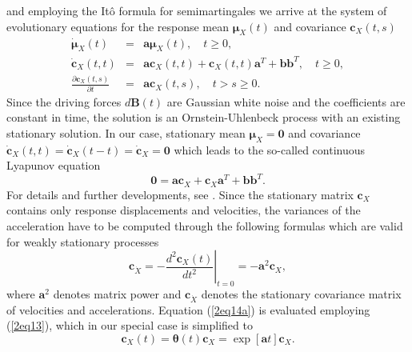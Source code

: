\documentclass[preprint,12pt,authoryear]{elsarticle}
\newcommand{\bs}[1]{{\boldsymbol{#1}}}
\begin{document}
and employing the It\^{o} formula for semimartingales we arrive at the system of evolutionary equations for the response mean $\bs{\mu}_X(t)$ and covariance $\bs{c}_X(t,s)$
\begin{eqnarray}
\bs{\dot{\mu}}_X(t)&=&\bs{a\mu}_X(t),\quad t\geq0,\label{2eq11}\\
\bs{\dot{c}}_X(t,t)&=&\bs{ac}_X(t,t)+\bs{c}_X(t,t)\bs{a}^T+\bs{bb}^T,\quad t\geq0,\label{2eq12}\\
\frac{\partial\bs{c}_X(t,s)}{\partial t}&=&\bs{ac}_X(t,s),\quad t>s\geq0.\label{2eq13}
\end{eqnarray}
Since the driving forces $d\bs{B}(t)$ are Gaussian white noise and the coefficients are constant in time, the solution is an Ornstein-Uhlenbeck process with an existing stationary solution. In our case, stationary mean $\bs{\mu}_X=\bs{0}$ and covariance $\bs{\dot{c}}_X(t,t)=\bs{\dot{c}}_X(t-t)=\bs{\dot{c}}_X=\bs{0}$ which leads to the so-called continuous Lyapunov equation
\begin{equation}
\bs{0}=\bs{ac}_X+\bs{c}_X\bs{a}^T+\bs{bb}^T.
\label{2eq14}
\end{equation}
For details and further developments, see \citep{Grigoriu_stoch}. Since the stationary matrix $\bs{c}_X$ contains only response displacements and velocities, the variances of the acceleration have to be computed through the following formulas which are valid for weakly stationary processes
\begin{equation}
\bs{c}_{\dot{X}}=\left.-\frac{d^2\bs{c}_X(t)}{dt^2}\right|_{t=0}=-\bs{a}^2\bs{c}_X,
\label{2eq14a}
\end{equation}
where $\bs{a}^2$ denotes matrix power and $\bs{c}_{\dot{X}}$ denotes the stationary covariance matrix of velocities and accelerations. Equation (\ref{2eq14a}) is evaluated employing (\ref{2eq13}), which in our special case is simplified to
\begin{equation}
\bs{c}_X(t)=\bs{\theta}(t)\bs{c}_X=\exp[\bs{a}t]\bs{c}_X.
\label{2eq14b}
\end{equation}
\end{document}
